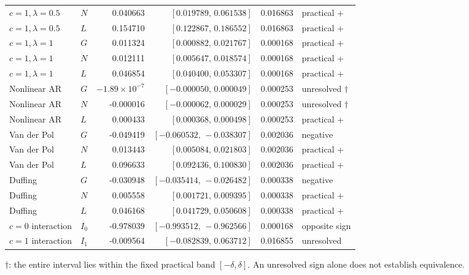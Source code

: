 \begin{longtable}{llrrrl}
$c=1,\lambda=0.5$ & $N$ & 0.040663 & $[0.019789,\,0.061538]$ & 0.016863 & practical + \\
$c=1,\lambda=0.5$ & $L$ & 0.154710 & $[0.122867,\,0.186552]$ & 0.016863 & practical + \\
$c=1,\lambda=1$ & $G$ & 0.011324 & $[0.000882,\,0.021767]$ & 0.000168 & practical + \\
$c=1,\lambda=1$ & $N$ & 0.012111 & $[0.005647,\,0.018574]$ & 0.000168 & practical + \\
$c=1,\lambda=1$ & $L$ & 0.046854 & $[0.040400,\,0.053307]$ & 0.000168 & practical + \\
Nonlinear AR & $G$ & \ensuremath{-1.89\times10^{-7}} & $[-0.000050,\,0.000049]$ & 0.000253 & unresolved $\dagger$ \\
Nonlinear AR & $N$ & -0.000016 & $[-0.000062,\,0.000029]$ & 0.000253 & unresolved $\dagger$ \\
Nonlinear AR & $L$ & 0.000433 & $[0.000368,\,0.000498]$ & 0.000253 & practical + \\
Van der Pol & $G$ & -0.049419 & $[-0.060532,\,-0.038307]$ & 0.002036 & negative \\
Van der Pol & $N$ & 0.013443 & $[0.005084,\,0.021803]$ & 0.002036 & practical + \\
Van der Pol & $L$ & 0.096633 & $[0.092436,\,0.100830]$ & 0.002036 & practical + \\
Duffing & $G$ & -0.030948 & $[-0.035414,\,-0.026482]$ & 0.000338 & negative \\
Duffing & $N$ & 0.005558 & $[0.001721,\,0.009395]$ & 0.000338 & practical + \\
Duffing & $L$ & 0.046168 & $[0.041729,\,0.050608]$ & 0.000338 & practical + \\
$c=0$ interaction & $I_0$ & -0.978039 & $[-0.993512,\,-0.962566]$ & 0.000168 & opposite sign \\
$c=1$ interaction & $I_1$ & -0.009564 & $[-0.082839,\,0.063712]$ & 0.016855 & unresolved \\
\end{longtable}
\noindent $\dagger$: the entire interval lies within the fixed practical band $[-\delta,\delta]$. An unresolved sign alone does not establish equivalence.
\endgroup

